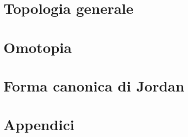 \documentclass[a4paper, 11pt, twoside, openright, italian]{memoir}
\begin{document}
\frontmatter

%


\mainmatter

\part{Topologia generale}


%
%


\part{Omotopia}


%
%
\part{Forma canonica di Jordan}

%
%
%
%
%
%
%
\part{Appendici}

%
%
%
%
\backmatter

\end{document}

